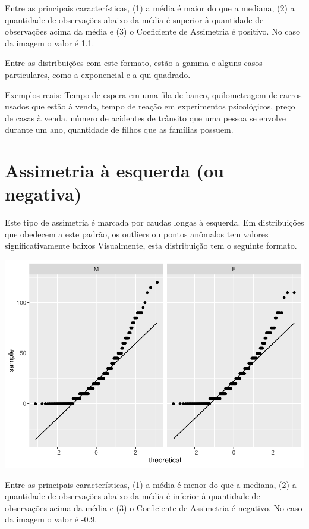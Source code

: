 \documentclass[
]{book}
\begin{document}
Entre as principais características, (1) a média é maior do que a mediana, (2) a quantidade de observações abaixo da média é superior à quantidade de observações acima da média e (3) o Coeficiente de Assimetria é positivo. No caso da imagem o valor é 1.1.

Entre as distribuições com este formato, estão a gamma e alguns casos particulares, como a exponencial e a qui-quadrado.

Exemplos reais: Tempo de espera em uma fila de banco, quilometragem de carros usados que estão à venda, tempo de reação em experimentos psicológicos, preço de casas à venda, número de acidentes de trânsito que uma pessoa se envolve durante um ano, quantidade de filhos que as famílias possuem.

\hypertarget{assimetria-uxe0-esquerda-ou-negativa}{%
\section{Assimetria à esquerda (ou negativa)}\label{assimetria-uxe0-esquerda-ou-negativa}}

Este tipo de assimetria é marcada por caudas longas à esquerda. Em distribuições que obedecem a este padrão, os outliers ou pontos anômalos tem valores significativamente baixos Visualmente, esta distribuição tem o seguinte formato.

\begin{center}\includegraphics{gitbook-demo_files/figure-latex/unnamed-chunk-33-1} \end{center}

Entre as principais características, (1) a média é menor do que a mediana, (2) a quantidade de observações abaixo da média é inferior à quantidade de observações acima da média e (3) o Coeficiente de Assimetria é negativo. No caso da imagem o valor é -0.9.
\end{document}

